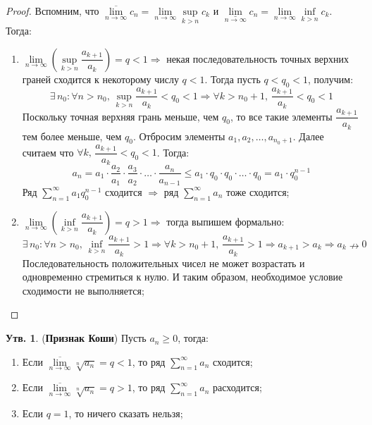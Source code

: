 \documentclass[12pt]{article}
\theoremstyle{definition}
\newtheorem{prop}{Утв.}
\newcommand{\ssum}[1]{\displaystyle \sum\limits_{n=1}^{\infty}{#1}_n}
\begin{document}
\begin{proof}
	Вспомним, что $\underset{n \to \infty}{\overline{\lim}}c_n = \lim\limits_{n \to \infty}\sup\limits_{k > n} c_k$ и $\underset{n \to \infty}{\underline{\lim}}c_n = \lim\limits_{n \to \infty} \inf\limits_{k > n} c_k$. Тогда:
	\begin{enumerate}[label ={(\arabic*)}]
		\item $\lim\limits_{n \to \infty} \left(\sup\limits_{k > n} \dfrac{a_{k+1}}{a_k}\right) = q < 1 \Rightarrow$ некая последовательность точных верхних граней сходится к некоторому числу $q < 1$. Тогда пусть $q < q_0 < 1$, получим:
		$$
			\exists \, n_0 \colon \forall n > n_0, \, \sup\limits_{k > n} \dfrac{a_{k+1}}{a_k} < q_0 < 1 \Rightarrow \forall k > n_0 + 1, \, \dfrac{a_{k+1}}{a_k} < q_0 < 1
		$$ 
		Поскольку точная верхняя грань меньше, чем $q_0$, то все такие элементы $\dfrac{a_{k+1}}{a_k}$ тем более меньше, чем $q_0$. Отбросим элементы $a_1, a_2, \dotsc, a_{n_0 + 1}$. Далее считаем что $\forall k, \, \dfrac{a_{k+1}}{a_k} < q_0 < 1$. Тогда:
		$$
			a_n = a_1{\cdot} \dfrac{a_2}{a_1}{\cdot}\dfrac{a_3}{a_2}{\cdot}\dotsc{\cdot}\dfrac{a_n}{a_{n-1}} \leq a_1{\cdot}q_0{\cdot}q_0{\cdot} \dotsc {\cdot} q_0 = a_1 {\cdot} q_0^{n-1}
		$$
		Ряд $\displaystyle \sum\limits_{n = 1}^{\infty}a_1q_0^{n-1}$ сходится $\Rightarrow$ ряд $\ssum{a}$ тоже сходится; 
		\item $\lim\limits_{n \to \infty} \left(\inf\limits_{k > n} \dfrac{a_{k+1}}{a_k}\right) = q > 1 \Rightarrow$ тогда выпишем формально:
		$$
			\exists \, n_0 \colon \forall n > n_0, \, \inf\limits_{k > n} \dfrac{a_{k+1}}{a_k} > 1 \Rightarrow \forall k > n_0 + 1, \, \dfrac{a_{k+1}}{a_k} > 1 \Rightarrow a_{k+1} > a_k \Rightarrow a_{k} \nrightarrow 0
		$$
		Последовательность положительных чисел не может возрастать и одновременно стремиться к нулю. И таким образом, необходимое условие сходимости не выполняется;
	\end{enumerate}
\end{proof}
\newpage
\begin{prop}(\textbf{Признак Коши})
	Пусть $a_n \geq 0$, тогда:
	\begin{enumerate}[label ={(\arabic*)}]
		\item Если $\underset{n \to \infty}{\overline{\lim}} \sqrt[n]{a_n} = q < 1$, то ряд $\ssum{a}$ сходится;
		\item Если $\underset{n \to \infty}{\overline{\lim}} \sqrt[n]{a_n} = q > 1$, то ряд $\ssum{a}$ расходится;
		\item Если $q = 1$, то ничего сказать нельзя;
	\end{enumerate}
\end{prop}
\end{document}
